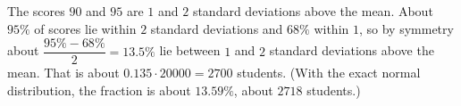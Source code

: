 The scores $90$ and $95$ are $1$ and $2$ standard deviations above the mean. About $95\%$ of scores lie within $2$ standard deviations and $68\%$ within $1$, so by symmetry about $\dfrac{95\%-68\%}{2}=13.5\%$ lie between $1$ and $2$ standard deviations above the mean. That is about $0.135\cdot20000=\boxed{2700}$ students. (With the exact normal distribution, the fraction is about $13.59\%$, about $2718$ students.)
